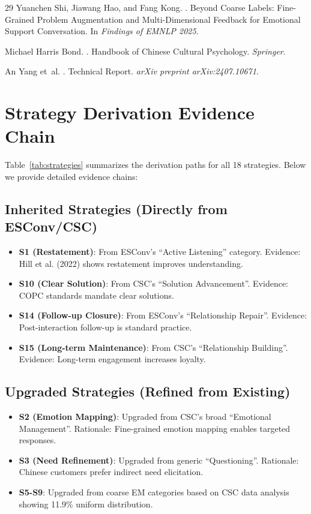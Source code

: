 \documentclass[11pt]{article}
\begin{document}
\begin{table}[t]
\begin{thebibliography}{29}
Yuanchen Shi, Jiawang Hao, and Fang Kong.
.
\newblock Beyond Coarse Labels: Fine-Grained Problem Augmentation and Multi-Dimensional Feedback for Emotional Support Conversation.
\newblock In \emph{Findings of EMNLP 2025}.

Michael Harris Bond.
.
\newblock Handbook of Chinese Cultural Psychology.
\newblock \emph{Springer}.

An Yang et~al.
.
 Technical Report.
\newblock \emph{arXiv preprint arXiv:2407.10671}.

\end{thebibliography}

\appendix

\section{Strategy Derivation Evidence Chain}

Table~\ref{tab:strategies} summarizes the derivation paths for all 18 strategies. Below we provide detailed evidence chains:

\subsection*{Inherited Strategies (Directly from ESConv/CSC)}
\begin{itemize}
  \item \textbf{S1 (Restatement)}: From ESConv's ``Active Listening'' category. Evidence: Hill et al. (2022) shows restatement improves understanding.
  \item \textbf{S10 (Clear Solution)}: From CSC's ``Solution Advancement''. Evidence: COPC standards mandate clear solutions.
  \item \textbf{S14 (Follow-up Closure)}: From ESConv's ``Relationship Repair''. Evidence: Post-interaction follow-up is standard practice.
  \item \textbf{S15 (Long-term Maintenance)}: From CSC's ``Relationship Building''. Evidence: Long-term engagement increases loyalty.
\end{itemize}

\subsection*{Upgraded Strategies (Refined from Existing)}
\begin{itemize}
  \item \textbf{S2 (Emotion Mapping)}: Upgraded from CSC's broad ``Emotional Management''. Rationale: Fine-grained emotion mapping enables targeted responses.
  \item \textbf{S3 (Need Refinement)}: Upgraded from generic ``Questioning''. Rationale: Chinese customers prefer indirect need elicitation.
  \item \textbf{S5-S9}: Upgraded from coarse EM categories based on CSC data analysis showing 11.9\% uniform distribution.
\end{itemize}


\end{table}
\end{document}
